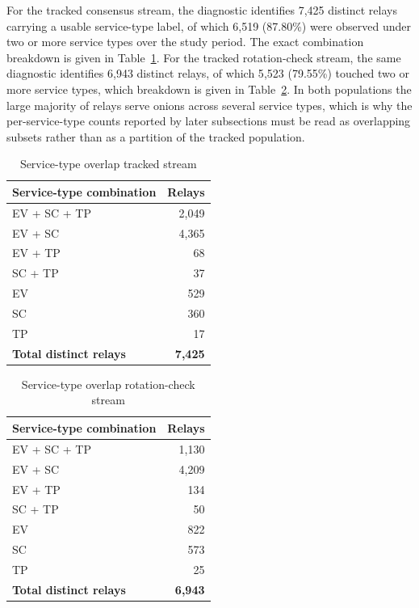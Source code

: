 \documentclass[conference]{IEEEtran}
\begin{document}
For the tracked consensus stream, the diagnostic identifies 7{,}425 distinct relays carrying a usable service-type label, of which 6{,}519 (87.80\%) were observed 
under two or more service types over the study period. The exact combination breakdown is given in Table~\ref{tab:overlap_tracked}. For the tracked rotation-check stream, the same diagnostic 
identifies 6{,}943 distinct relays, of which 5{,}523 (79.55\%) touched two or more service types, which breakdown is given in Table~\ref{tab:overlap_rotated}. In both populations the large majority 
of relays serve onions across several service types, which is why the per-service-type counts reported by later subsections must be read as overlapping subsets rather than as a partition of the tracked population.
 
\begin{table}[htbp]
\caption{Service-type overlap tracked stream}
\begin{center}
\begin{tabular}{|l|r|}
\hline
\textbf{Service-type combination} & \textbf{Relays} \\
\hline
EV + SC + TP & 2{,}049 \\
\hline
EV + SC & 4{,}365 \\
\hline
EV + TP & 68 \\
\hline
SC + TP & 37 \\
\hline
EV & 529 \\
\hline
SC & 360 \\
\hline
TP & 17 \\
\hline
{\textbf{Total distinct relays}} & \textbf{7{,}425} \\
\hline
\end{tabular}
\label{tab:overlap_tracked}
\end{center}
\end{table}
 
\begin{table}[htbp]
\caption{Service-type overlap rotation-check stream}
\begin{center}
\begin{tabular}{|l|r|}
\hline
\textbf{Service-type combination} & \textbf{Relays} \\
\hline
EV + SC + TP & 1{,}130 \\
\hline
EV + SC & 4{,}209 \\
\hline
EV + TP & 134 \\
\hline
SC + TP & 50 \\
\hline
EV & 822 \\
\hline
SC & 573 \\
\hline
TP & 25 \\
\hline
{\textbf{Total distinct relays}} & \textbf{6{,}943} \\
\hline
\end{tabular}
\label{tab:overlap_rotated}
\end{center}
\end{table}
\end{document}
